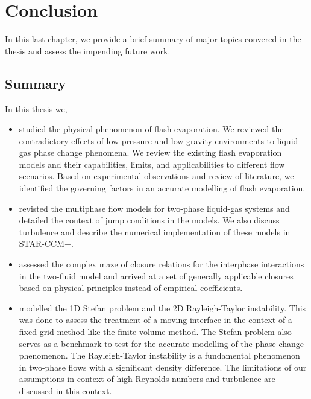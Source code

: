 \section{Conclusion}\label{chap4}
In this last chapter, we provide a brief summary of major topics convered in 
the thesis and assess the impending future work. 

\subsection{Summary}
In this thesis we,
\begin{itemize}
    \item studied the physical phenomenon of flash evaporation. We reviewed 
    the contradictory effects of low-pressure and low-gravity environments to liquid-gas
    phase change phenomena. We review the existing flash evaporation models and their 
    capabilities, limits, and applicabilities to different flow scenarios.
    Based on experimental 
    observations and review of literature, we identified the governing 
    factors in an accurate modelling of flash evaporation.

    \item revisted the multiphase flow models for two-phase liquid-gas systems and 
    detailed the context of jump conditions in the models. We also discuss turbulence and
    describe the numerical implementation of these models in STAR-CCM+.
    
    \item assessed the complex maze of closure relations for the interphase interactions
    in the two-fluid model and arrived at a set of generally applicable closures based on
    physical principles instead of empirical coefficients. 

    \item modelled the 1D Stefan problem and the 2D Rayleigh-Taylor instability. This was done
    to assess the treatment of a moving 
    interface in the context of a fixed grid method like the finite-volume method. The 
    Stefan problem also serves as a benchmark to test for the accurate modelling of the phase change phenomenon.
    The Rayleigh-Taylor instability is a fundamental phenomenon in two-phase flows with a significant 
    density difference. The limitations of our assumptions in context of high Reynolds numbers
    and turbulence are discussed in 
    this context.
    

\end{itemize}
